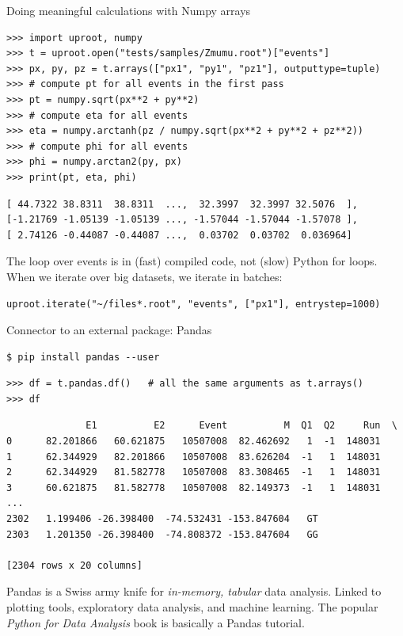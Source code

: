 \documentclass[aspectratio=169]{beamer}
\begin{document}
\begin{frame}[fragile]{Doing meaningful calculations with Numpy arrays}
\small
\begin{verbatim}
>>> import uproot, numpy
>>> t = uproot.open("tests/samples/Zmumu.root")["events"]
>>> px, py, pz = t.arrays(["px1", "py1", "pz1"], outputtype=tuple)
>>> # compute pt for all events in the first pass
>>> pt = numpy.sqrt(px**2 + py**2)
>>> # compute eta for all events
>>> eta = numpy.arctanh(pz / numpy.sqrt(px**2 + py**2 + pz**2))
>>> # compute phi for all events
>>> phi = numpy.arctan2(py, px)
>>> print(pt, eta, phi)
\end{verbatim}
\begin{verbatim}
[ 44.7322 38.8311  38.8311  ...,  32.3997  32.3997 32.5076  ],
[-1.21769 -1.05139 -1.05139 ..., -1.57044 -1.57044 -1.57078 ],
[ 2.74126 -0.44087 -0.44087 ...,  0.03702  0.03702  0.036964]
\end{verbatim}

\normalsize
The loop over events is in (fast) compiled code, not (slow) Python for loops. When we iterate over big datasets, we iterate in batches:

\small
\begin{verbatim}
uproot.iterate("~/files*.root", "events", ["px1"], entrystep=1000)
\end{verbatim}
\end{frame}

\begin{frame}[fragile]{Connector to an external package: Pandas}
\vspace{0.1 cm}
\small
\begin{verbatim}
$ pip install pandas --user
\end{verbatim}
\begin{verbatim}
>>> df = t.pandas.df()   # all the same arguments as t.arrays()
>>> df
\end{verbatim}
\begin{verbatim}
              E1          E2      Event          M  Q1  Q2     Run  \
0      82.201866   60.621875   10507008  82.462692   1  -1  148031
1      62.344929   82.201866   10507008  83.626204  -1   1  148031
2      62.344929   81.582778   10507008  83.308465  -1   1  148031
3      60.621875   81.582778   10507008  82.149373  -1   1  148031
...
2302   1.199406 -26.398400  -74.532431 -153.847604   GT
2303   1.201350 -26.398400  -74.808372 -153.847604   GG

[2304 rows x 20 columns]
\end{verbatim}

\normalsize
Pandas is a Swiss army knife for {\it in-memory, tabular} data analysis. Linked to plotting tools, exploratory data analysis, and machine learning. The popular {\it Python for Data Analysis} book is basically a Pandas tutorial.
\end{frame}
\end{document}
